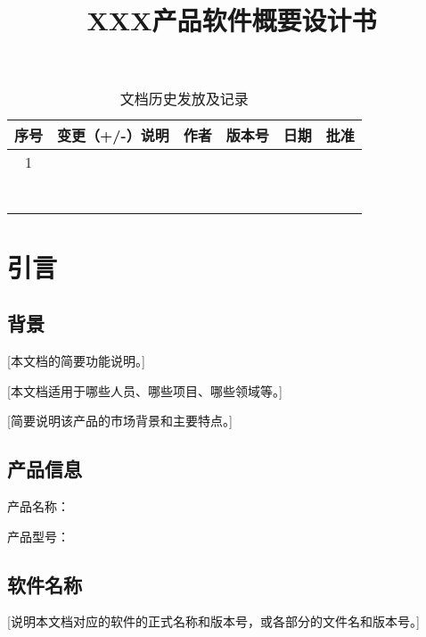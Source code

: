 \documentclass[10pt,a4paper,titlepage]{article} %
\title{XXX产品软件概要设计书}
\author{}
\date{}
\begin{document}
\maketitle

\renewcommand{\thetable}{}
\renewcommand{\captionfont}{\Large}
\begin{table}[h]


\Large   
\caption{文档历史发放及记录}  
\begin{center}  
\begin{tabular}{|c|p{4.5cm}<{\centering}|c|c|c|c|}  
\hline  
序号 & 变更（+/-）说明 & 作者 & 版本号 & 日期 & 批准 \\ \hline  
1 &  &  &  &  &  \\ \hline
  &  &  &  &  &  \\ \hline
  &  &  &  &  &  \\ \hline
  &  &  &  &  &  \\ \hline
  &  &  &  &  &  \\ \hline 
  &  &  &  &  &  \\ \hline
  &  &  &  &  &  \\ \hline
  &  &  &  &  &  \\ \hline 

\end{tabular}  
\end{center}  
\end{table} 
\clearpage
\tableofcontents  %
\clearpage
\section{引言}
\subsection{背景}
[本文档的简要功能说明。]

[本文档适用于哪些人员、哪些项目、哪些领域等。]

[简要说明该产品的市场背景和主要特点。]
\subsection{产品信息}
产品名称：

产品型号：

\subsection{软件名称}
[说明本文档对应的软件的正式名称和版本号，或各部分的文件名和版本号。]\newline
\end{document}
